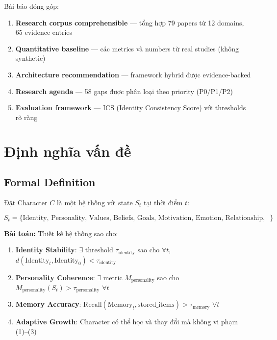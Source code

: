 \documentclass[10pt,leqno]{amsart}
\begin{document}
Bài báo đóng góp:
\begin{enumerate}
    \item \textbf{Research corpus comprehensible} --- tổng hợp 79 papers từ 12 domains, 65 evidence entries
    \item \textbf{Quantitative baseline} --- các metrics và numbers từ real studies (không synthetic)
    \item \textbf{Architecture recommendation} --- framework hybrid được evidence-backed
    \item \textbf{Research agenda} --- 58 gaps được phân loại theo priority (P0/P1/P2)
    \item \textbf{Evaluation framework} --- ICS (Identity Consistency Score) với thresholds rõ ràng
\end{enumerate}


\section{Định nghĩa vấn đề}

\subsection{Formal Definition}

Đặt Character $C$ là một hệ thống với state $S_t$ tại thời điểm $t$:

\begin{equation}
S_t = \{\text{Identity, Personality, Values, Beliefs, Goals, Motivation, Emotion, Relationship, Memory, Knowledge, Habits, Preferences, WorldState}\}
\end{equation}

\textbf{Bài toán:} Thiết kế hệ thống sao cho:
\begin{enumerate}
    \item \textbf{Identity Stability}: $\exists$ threshold $\tau_{\text{identity}}$ sao cho $\forall t$, $d(\text{Identity}_t, \text{Identity}_0) < \tau_{\text{identity}}$
    \item \textbf{Personality Coherence}: $\exists$ metric $M_{\text{personality}}$ sao cho $M_{\text{personality}}(S_t) > \tau_{\text{personality}}$ $\forall t$
    \item \textbf{Memory Accuracy}: $\text{Recall}(\text{Memory}_t, \text{stored\_items}) > \tau_{\text{memory}}$ $\forall t$
    \item \textbf{Adaptive Growth}: Character có thể học và thay đổi mà không vi phạm (1)--(3)
\end{enumerate}
\end{document}
